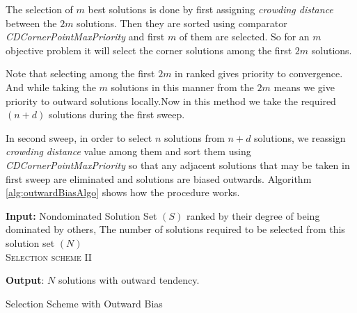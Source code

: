 \documentclass[journal]{IEEEtran}
\begin{document}
The selection of $m$ best solutions is done by first assigning \textit{crowding distance} between the $2m$ solutions. Then they are sorted using comparator \textit{CDCornerPointMaxPriority} and first $m$ of them are selected. So for an $m$ objective problem it will select the corner solutions among the first $2m$ solutions.

Note that selecting among the first $2m$ in ranked gives priority to convergence. And while taking the $m$ solutions in this manner from the $2m$ means we give priority to outward solutions locally.Now in this method we take the required $(n+d)$ solutions during the first sweep.

In second sweep, in order to select $n$ solutions from $n+d$ solutions, we reassign \textit{crowding distance} value among them and sort them using \textit{CDCornerPointMaxPriority} so that any adjacent solutions that may be taken in first sweep are eliminated and solutions are biased outwards. Algorithm \ref{alg:outwardBiasAlgo} shows how the procedure works.



\begin{algorithm}[!h]
\textbf{Input:} Nondominated Solution Set $(S)$ ranked by their degree of being dominated by others, The number of solutions required to be selected from this solution set $(N)$\\
\textsc{Selection scheme II}
\begin{algorithmic}[1]
 
	\ENDFOR
{}	
\ENDWHILE
{}
\end{algorithmic}
\textbf{Output}: $N$ solutions with outward tendency.
\caption{Selection Scheme with Outward Bias}
\label{alg:outwardBiasAlgo}
\end{algorithm}
\end{document}
